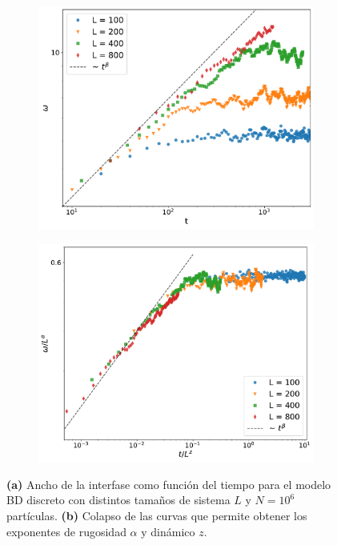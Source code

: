 \begin{figure}[!b]
    \hspace*{-1cm}
    \begin{subfigure}{.55\textwidth}
      \centering
      \includegraphics[width=\textwidth]{width_L.pdf}
      \caption{}
    \end{subfigure}
    \begin{subfigure}{.55\textwidth}
      \centering
      \includegraphics[width=\textwidth]{width_L_colapse.pdf}
      \caption{}
    \end{subfigure}
    \caption[Ancho de la interfase en el modelo BD discreto para distintos tamaños de sistema y colapso de curvas.]{\textbf{(a)} Ancho de la interfase como función del tiempo para el modelo BD discreto con distintos tamaños de sistema $L$ y $N = 10^6$ partículas. \textbf{(b)} Colapso de las curvas que permite obtener los exponentes de rugosidad $\alpha$ y dinámico $z$.}
    \label{fig:width_L}
\end{figure}


